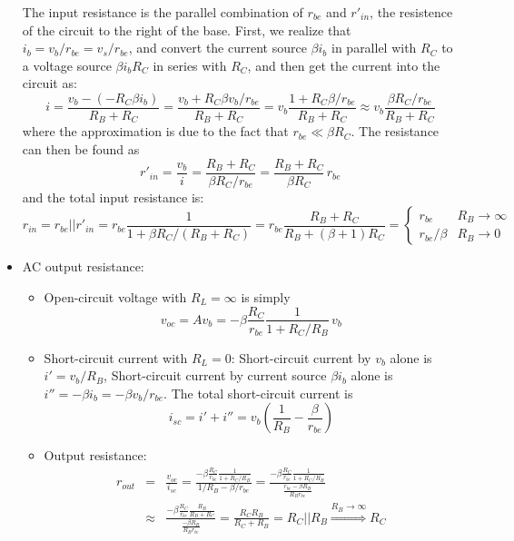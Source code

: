 \documentclass{article}
\begin{document}
\begin{itemize}
  The input resistance is the parallel combination of $r_{be}$ and
  $r'_{in}$, the resistence of the circuit to the right of the base. 
  First, we realize that $i_b=v_b/r_{be}=v_s/r_{be}$, and convert the
  current source $\beta i_b$ in parallel with $R_C$ to a voltage source
  $\beta i_bR_C$ in series with $R_C$, and then get the current into the
  circuit as:
  \begin{equation}
  i=\frac{v_b-(-R_C\beta i_b)}{R_B+R_C}=\frac{v_b+R_C \beta v_b/r_{be}}{R_B+R_C}
  =v_b \frac{1+R_C \beta /r_{be}}{R_B+R_C}  
  \approx v_b \frac{\beta R_C /r_{be}}{R_B+R_C}
  \end{equation}
  where the approximation is due to the fact that $r_{be}\ll \beta R_C$. 
  The resistance can then be found as
  \begin{equation}
  r'_{in}=\frac{v_b}{i}
  =\frac{R_B+R_C}{\beta R_C /r_{be}}=\frac{R_B+R_C}{\beta R_C}\,r_{be}
  \end{equation}
  and the total input resistance is:
  \begin{equation}
  r_{in}=r_{be}||r'_{in}=r_{be}\frac{1}{1+\beta R_C/(R_B+R_C)}
  =r_{be}\frac{R_B+R_C}{R_B+(\beta+1) R_C}
  =\left\{\begin{array}{ll} r_{be} & R_B\rightarrow\infty\\
  r_{be}/\beta & R_B\rightarrow 0\end{array}\right.
  \end{equation}
\item AC output resistance:

  \begin{itemize}
  \item Open-circuit voltage with $R_L=\infty$ is simply
    \begin{equation}
    v_{oc}=A v_b=-\beta\frac{R_C}{r_{be}}\frac{1}{1+R_C/R_B}\,v_b
    \end{equation}

  \item Short-circuit current with $R_L=0$:
    Short-circuit current by $v_b$ alone is $i'=v_b/R_B$,
    Short-circuit current by current source $\beta i_b$ alone is
    $i''=-\beta i_b=-\beta v_b/r_{be}$. The total short-circuit current is
    \begin{equation}
    i_{sc}=i'+i''=v_b\left(\frac{1}{R_B}-\frac{\beta}{r_{be}}\right)
    \end{equation}
  \item Output resistance:
    \begin{eqnarray}
    r_{out}&=&\frac{v_{oc}}{i_{sc}}=\frac{-\beta\frac{R_C}{r_{be}}\frac{1}{1+R_C/R_B}}
    {1/R_B-\beta/r_{be}}
    =\frac{-\beta\frac{R_C}{r_{be}}\frac{1}{1+R_C/R_B}}{\frac{r_{be}-\beta R_B}{R_B r_{be}}}
    \nonumber\\
    &\approx& \frac{-\beta\frac{R_C}{r_{be}}\frac{R_B}{R_B+R_C}}{\frac{-\beta R_B}{R_B r_{be}}}
    =\frac{R_C R_B}{R_C+R_B}=R_C||R_B\stackrel{R_B\rightarrow\infty}{\Longrightarrow}R_C
    \end{eqnarray}

  \end{itemize}

\end{itemize}
\end{document}
